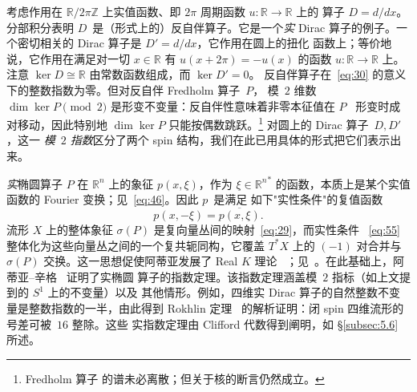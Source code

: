 \documentclass[11pt]{amsart}
\theoremstyle{definition}
\theoremstyle{remark}
\theoremstyle{plain}
\numberwithin{equation}{section}
\renewcommand{\:}{\colon}
\newcommand{\Ahat}{{\hat A}}
\newcommand{\CC}{{\mathbb C}}
\newcommand{\HH}{{\mathbb H}}
\DeclareMathOperator{\pt}{pt}
\newcommand{\RR}{{\mathbb R}}
\newcommand{\ZZ}{{\mathbb Z}}
\newcommand{\cir}{S^1}
\DeclareMathOperator{\coker}{coker}
\DeclareMathOperator{\ind}{ind}
\newcommand{\zmod}[1]{\ZZ/#1\ZZ}
\newcommand{\zt}{\zmod2}
\DeclareMathOperator{\Cliff}{Cliff}
\begin{document}
考虑作用在 $\RR/2\pi \ZZ$ 上实值函数、即 $2\pi $ 周期函数 $u\:\RR\to\RR$ 上的
算子 $D=d/dx$。分部积分表明 $D$~是（形式上的）反自伴算子。它是一个\emph{实}
Dirac 算子的例子。一个密切相关的 Dirac 算子是 $D'=d/dx$，它作用在圆上的扭化
函数上；等价地说，它作用在满足对一切 $x\in \RR$ 有 $u(x+2\pi )=-u(x)$ 的函数
$u\:\RR\to\RR$ 上。注意 $\ker D\cong \RR$ 由常数函数组成，而 $\ker D'=0$。
反自伴算子在~\eqref{eq:30} 的意义下的整数指数为零。但对反自伴 Fredholm 算子~$P$，
模~$2$ 维数 $\dim \ker P\pmod2$ 是形变不变量：反自伴性意味着非零本征值在 $P$~
形变时成对移动，因此特别地 $\dim\ker P$ 只能按偶数跳跃。\footnote{Fredholm 算子
的谱未必离散；但关于核的断言仍然成立。} 对圆上的 Dirac 算子~$D,D'$，这一
\emph{模~$2$ 指数}区分了两个 spin 结构，我们在此已用具体的形式把它们表示出来。

\emph{实}椭圆算子 $P$ 在 $\RR^n$ 上的象征 $p(x,\xi )$，作为 $\xi \in {\RR^n}^*$
的函数，本质上是某个实值函数的 Fourier 变换；见~\eqref{eq:46}。因此 $p$~是满足
如下"实性条件"的复值函数
  \begin{equation}\label{eq:55}
     p(x,-\xi )=\overline{p(x,\xi )}.
  \end{equation}
流形 $X$ 上的整体象征 $\sigma (P)$ 是复向量丛间的映射~\eqref{eq:29}，而实性条件
~\eqref{eq:55} 整体化为这些向量丛之间的一个复共轭同构，它覆盖 $T^*X$ 上的
$(-1)$ 对合并与 $\sigma (P)$ 交换。这一思想促使阿蒂亚发展了 Real $K$ 理论
~\cite{A3}；见~\cite[\S8]{Seg4}。在此基础上，阿蒂亚–辛格~\cite{AS5} 证明了实椭圆
算子的指数定理。该指数定理涵盖模~$2$ 指标（如上文提到的 $\cir$ 上的不变量）以及
其他情形。例如，四维实 Dirac 算子的自然整数不变量是整数指数的一半，由此得到
Rokhlin 定理~\cite{Roh} 的解析证明：闭 spin 四维流形的号差可被~$16$ 整除。这些
实指数定理由 Clifford 代数得到阐明，如 \S\ref{subsec:5.6} 所述。
\end{document}
